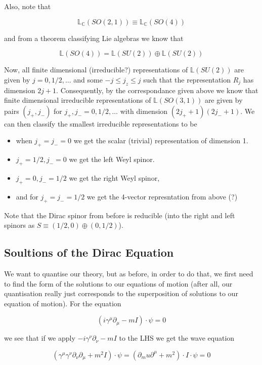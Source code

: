 \documentclass{article}
\theoremstyle{definition}
\begin{document}
Also, note that

$$ \mathbb{L}_{\mathbb{C}}(SO(2, 1)) \equiv \mathbb{L}_{\mathbb{C}}(SO(4)) $$

and from a theorem classifying Lie algebras we know that

$$ \mathbb{L}(SO(4)) = \mathbb{L}(SU(2)) \oplus \mathbb{L}(SU(2)) $$

Now, all finite dimensional (irreducible?) representations of $\mathbb{L}(SU(2))$ are given by
$j=0, 1/2, \dots$ and some $-j \leq j_z \leq j$ such that the representation
$R_j$ has dimension $2j + 1$. Consequently, by the correspondance given above we
know that finite dimensional irreducible representations of $\mathbb{L}(SO(3,
1))$ are given by pairs $(j_+, j_-)$ for $j_+, j_- = 0, 1/2, \dots$ with
dimension $(2j_+ + 1)(2j_- + 1)$. We can then classify the smallest irreducible
representations to be

\begin{itemize}
\item when $j_+ = j_- = 0$ we get the scalar (trivial) representation of
  dimension 1.
\item $j_+ = 1/2, j_- = 0$ we get the left Weyl spinor.
\item $j_+ = 0, j_- = 1/2$ we get the right Weyl spinor,
\item and for $j_+ = j_- = 1/2$ we get the 4-vector represntation from above (?)
\end{itemize}

Note that the Dirac spinor from before is reducible (into the right and left
spinors as $S \equiv (1/2, 0) \oplus (0, 1/2)$). 

\subsection{Soultions of the Dirac Equation}

We want to quantise our theory, but as before, in order to do that, we first
need to find the form of the solutions to our equations of motion (after all,
our quantisation really just corresponds to the superposition of solutions to
our equation of motion). For the equation

$$ (i\gamma^\mu \partial_\mu - mI) \cdot \psi = 0 $$

we see that if we apply $-i \gamma^\nu \partial_\nu - mI $ to the LHS we get the
wave equation

$$ (\gamma^\mu \gamma^\nu \partial_\nu \partial_\mu + m^2 I) \cdot \psi =
(\partial_mu \partial^\mu + m^2) \cdot I \cdot \psi = 0 $$
\end{document}
